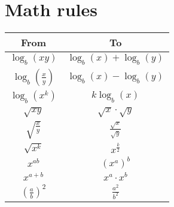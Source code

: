 \documentclass{article}
\begin{document}
\section{Math rules}
\begin{table}[H]
    \begin{tabular}{|c|c|}
    \hline
        \textbf{From} & \textbf{To} \\
    \hline
        \(\log_b{(xy)}\) & \(\log_b{(x)} + \log_b{(y)}\) \\
    \hline
        \(\log_b{(\frac{x}{y})}\) & \(\log_b{(x)} - \log_b{(y)}\) \\
    \hline
        \(\log_b{(x^k)}\) & \(k \log_b{(x)}\) \\
    \hline
        \(\sqrt{xy}\) & \(\sqrt{x} \cdot \sqrt{y}\) \\
    \hline
        \(\sqrt{\frac{x}{y}}\) & \(\frac{\sqrt{x}}{\sqrt{y}}\) \\
    \hline
        \(\sqrt{x^k}\) & \(x^{\frac{k}{2}}\) \\
    \hline
        \(x^{ab}\) & \((x^a)^b\) \\
    \hline
        \(x^{a+b}\) & \(x^a \cdot x^b\) \\
    \hline
        \((\frac{a}{b})^2\) & \(\frac{a^2}{b^2}\) \\
    \hline
    \end{tabular}
\end{table}
\end{document}
